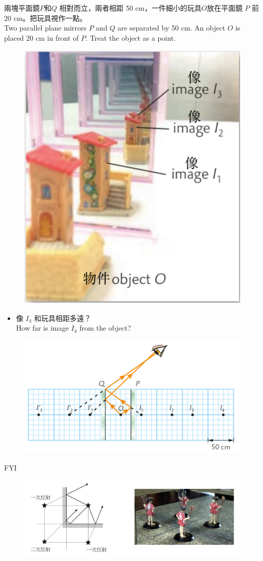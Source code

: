 \documentclass[beamer=true]{standalone}
\begin{document}
\begin{eg}
    兩塊平面鏡$P$和$Q$ 相對而立，兩者相距 50 cm，一件細小的玩具$O$放在平面鏡 $P$ 前 20 cm。把玩具視作一點。\\Two parallel plane mirrors $P$ and $Q$ are separated by 50 cm. An object $O$ is placed 20 cm in front of $P$. Treat the object as a point.
    \begin{figure}
        \centering
        \includegraphics[width=0.3\linewidth]{assets/ddkopdk.png}
    \end{figure}
\end{eg}

\begin{eg}
    \begin{itemize}
        \item [] 像 $I_4$ 和玩具相距多遠？\\How far is image $I_4$ from the object?
    \end{itemize}\bigskip
\begin{figure}
        \centering
        \includegraphics[width=0.75\linewidth]{assets/ddqjoij12.png}
        
        
    \end{figure}
\end{eg}

\begin{frame}{FYI}
    \begin{figure}
        \centering
        \includegraphics[width=\linewidth]{assets/dj98qwu.png}
        
        
    \end{figure}
\end{frame}
\end{document}
